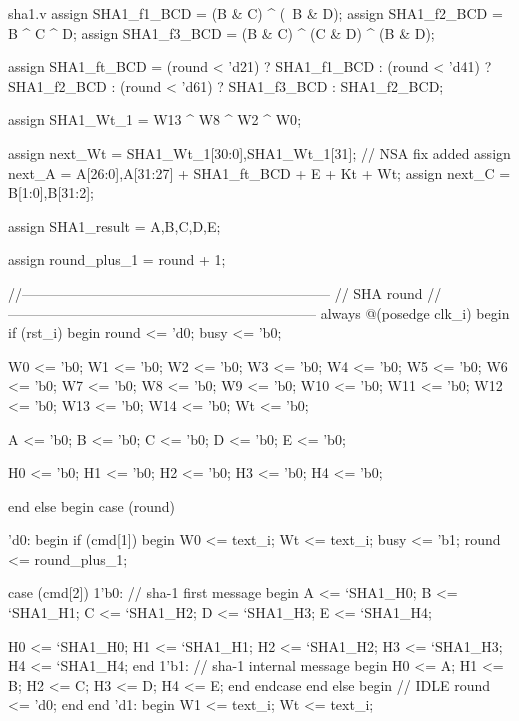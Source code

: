 \begin{chunk}{sha1.v}
  assign SHA1_f1_BCD = (B & C) ^ (~B & D);
  assign SHA1_f2_BCD = B ^ C ^ D;
  assign SHA1_f3_BCD = (B & C) ^ (C & D) ^ (B & D);
  
  assign SHA1_ft_BCD = (round < 'd21) ? SHA1_f1_BCD : (round < 'd41) ? SHA1_f2_BCD : (round < 'd61) ? SHA1_f3_BCD : SHA1_f2_BCD;
  
      assign SHA1_Wt_1 = {W13 ^ W8 ^ W2 ^ W0};

  assign next_Wt = {SHA1_Wt_1[30:0],SHA1_Wt_1[31]};  // NSA fix added
  assign next_A = {A[26:0],A[31:27]} + SHA1_ft_BCD + E + Kt + Wt;
  assign next_C = {B[1:0],B[31:2]};
  
  assign SHA1_result   = {A,B,C,D,E};
  
  assign round_plus_1 = round + 1;
  
  //------------------------------------------------------------------  
  // SHA round
  //------------------------------------------------------------------
  always @(posedge clk_i)
  begin
    if (rst_i)
    begin
      round <= 'd0;
      busy <= 'b0;

      W0  <= 'b0;
      W1  <= 'b0;
      W2  <= 'b0;
      W3  <= 'b0;
      W4  <= 'b0;
      W5  <= 'b0;
      W6  <= 'b0;
      W7  <= 'b0;
      W8  <= 'b0;
      W9  <= 'b0;
      W10 <= 'b0;
      W11 <= 'b0;
      W12 <= 'b0;
      W13 <= 'b0;
      W14 <= 'b0;
      Wt  <= 'b0;
      
      A <= 'b0;
      B <= 'b0;
      C <= 'b0;
      D <= 'b0;
      E <= 'b0;
      
      H0 <= 'b0;
      H1 <= 'b0;
      H2 <= 'b0;
      H3 <= 'b0;
      H4 <= 'b0;

    end
    else
    begin
      case (round)
      
      'd0:
        begin
          if (cmd[1])
          begin
            W0 <= text_i;
            Wt <= text_i;
            busy <= 'b1;
            round <= round_plus_1;
                                                 
            case (cmd[2])
              1'b0:  // sha-1 first message
                begin
                  A <= `SHA1_H0;
                  B <= `SHA1_H1;
                  C <= `SHA1_H2;
                  D <= `SHA1_H3;
                  E <= `SHA1_H4;
                  
                  H0 <= `SHA1_H0;
                  H1 <= `SHA1_H1;
                  H2 <= `SHA1_H2;
                  H3 <= `SHA1_H3;
                  H4 <= `SHA1_H4;
                end
              1'b1:  // sha-1 internal message
                begin
                  H0 <= A;
                  H1 <= B;
                  H2 <= C;
                  H3 <= D;
                  H4 <= E;
                end
            endcase
          end
          else
          begin  // IDLE
            round <= 'd0;
          end
        end
      'd1:
        begin
          W1 <= text_i;
          Wt <= text_i;
          

\end{chunk}
